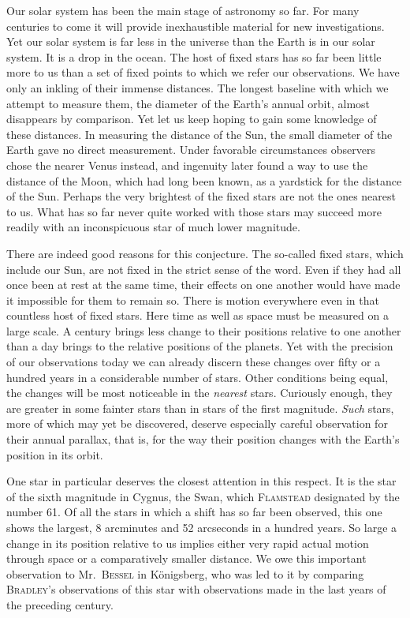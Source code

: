 Our solar system has been the main stage of astronomy so far. For many centuries to come it will provide inexhaustible material for new investigations. Yet our solar system is far less in the universe than the Earth is in our solar system. It is a drop in the ocean. The host of fixed stars has so far been little more to us than a set of fixed points to which we refer our observations. We have only an inkling of their immense distances. The longest baseline with which we attempt to measure them, the diameter of the Earth’s annual orbit, almost disappears by comparison. Yet let us keep hoping to gain some knowledge of these distances. In measuring the distance of the Sun, the small diameter of the Earth gave no direct measurement. Under favorable circumstances observers chose the nearer Venus instead{\renewcommand{\thefootnote}{**)}}, and ingenuity later found a way to use the distance of the Moon, which had long been known, as a yardstick for the distance of the Sun{\renewcommand{\thefootnote}{***)}}. Perhaps the very brightest of the fixed stars are not the ones nearest to us. What has so far never quite worked with those stars may succeed more readily with an inconspicuous star of much lower magnitude.

There are indeed good reasons for this conjecture. The so-called fixed stars, which include our Sun, are not fixed in the strict sense of the word. Even if they had all once been at rest at the same time, their effects on one another would have made it impossible for them to remain so. There is motion everywhere even in that countless host of fixed stars. Here time as well as space must be measured on a large scale.
%
A century brings less change to their positions relative to one another than a day brings to the relative positions of the planets. Yet with the precision of our observations today we can already discern these changes over fifty or a hundred years in a considerable number of stars. Other conditions being equal, the changes will be most noticeable in the \emph{nearest} stars. Curiously enough, they are greater in some fainter stars than in stars of the first magnitude. \emph{Such} stars, more of which may yet be discovered, deserve especially careful observation for their annual parallax, that is, for the way their position changes with the Earth’s position in its orbit.

One star in particular deserves the closest attention in this respect. It is the star of the sixth magnitude in Cygnus, the Swan, which \textsc{Flamstead} designated by the number 61. Of all the stars in which a shift has so far been observed, this one shows the largest, 8 arcminutes and 52 arcseconds in a hundred years. So large a change in its position relative to us implies either very rapid actual motion through space or a comparatively smaller distance. We owe this important observation to Mr.\ \textsc{Bessel} in Königsberg, who was led to it by comparing \textsc{Bradley}’s observations of this star with observations made in the last years of the preceding century.

